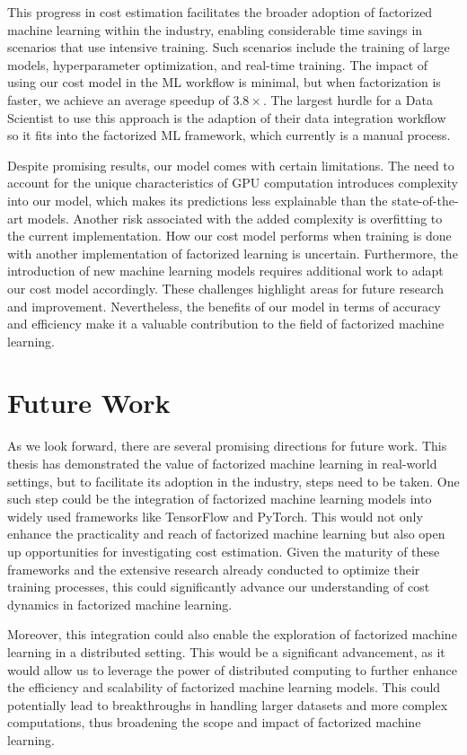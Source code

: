 This progress in cost estimation facilitates the broader adoption of factorized machine learning within the industry, enabling considerable time savings in scenarios that use intensive training. Such scenarios include the training of large models, hyperparameter optimization, and real-time training. The impact of using our cost model in the ML workflow is minimal, but when factorization is faster, we achieve an average speedup of $3.8\times$. The largest hurdle for a Data Scientist to use this approach is the adaption of their data integration workflow so it fits into the factorized ML framework, which currently is a manual process.

Despite promising results, our model comes with certain limitations. The need to account for the unique characteristics of GPU computation introduces complexity into our model, which makes its predictions less explainable than the state-of-the-art models. Another risk associated with the added complexity is overfitting to the current implementation. How our cost model performs when training is done with another implementation of factorized learning is uncertain. Furthermore, the introduction of new machine learning models requires additional work to adapt our cost model accordingly. These challenges highlight areas for future research and improvement. Nevertheless, the benefits of our model in terms of accuracy and efficiency make it a valuable contribution to the field of factorized machine learning.

\section{Future Work}
\label{sec:7-future-work}
As we look forward, there are several promising directions for future work. This thesis has demonstrated the value of factorized machine learning in real-world settings, but to facilitate its adoption in the industry, steps need to be taken. One such step could be the integration of factorized machine learning models into widely used frameworks like TensorFlow and PyTorch. This would not only enhance the practicality and reach of factorized machine learning but also open up opportunities for investigating cost estimation. Given the maturity of these frameworks and the extensive research already conducted to optimize their training processes, this could significantly advance our understanding of cost dynamics in factorized machine learning.

Moreover, this integration could also enable the exploration of factorized machine learning in a distributed setting. This would be a significant advancement, as it would allow us to leverage the power of distributed computing to further enhance the efficiency and scalability of factorized machine learning models. This could potentially lead to breakthroughs in handling larger datasets and more complex computations, thus broadening the scope and impact of factorized machine learning.

